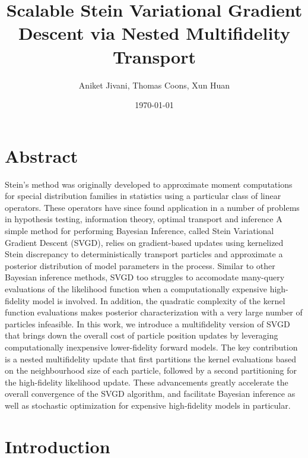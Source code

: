 \documentclass[12pt]{article}
\title{Scalable Stein Variational Gradient Descent via Nested Multifidelity Transport}
\author{Aniket Jivani, Thomas Coons, Xun Huan}
\date{\today}
\renewcommand{\[}{\left[}
\renewcommand{\]}{\right]}
\renewcommand{\(}{\left(}
\renewcommand{\)}{\right)}
\begin{document}
\maketitle
\section*{Abstract}
Stein's method was originally developed to approximate moment computations for special distribution families in statistics using a particular class of linear operators.
These operators have since found application in a number of problems in hypothesis testing, information theory, optimal transport and inference 
A simple method for performing Bayesian Inference, called Stein Variational Gradient Descent (SVGD), relies on gradient-based updates using kernelized Stein discrepancy to deterministically transport particles and approximate a posterior distribution of model parameters in the process. 
Similar to other Bayesian inference methods, SVGD too struggles to accomodate many-query evaluations of the likelihood function when a computationally expensive high-fidelity model is involved. In addition, the quadratic complexity of the kernel function evaluations makes posterior characterization with a very large number of particles infeasible.
In this work, we introduce a multifidelity version of SVGD that brings down the overall cost of particle position updates by leveraging computationally inexpensive lower-fidelity forward models. The key contribution is a nested multifidelity update that first partitions the kernel evaluations based on the neighbourhood size of each particle, followed by a second partitioning for the high-fidelity likelihood update.
These advancements greatly accelerate the overall convergence of the SVGD algorithm, and facilitate Bayesian inference as well as stochastic optimization for expensive high-fidelity models in particular.




\section{Introduction}
\end{document}
